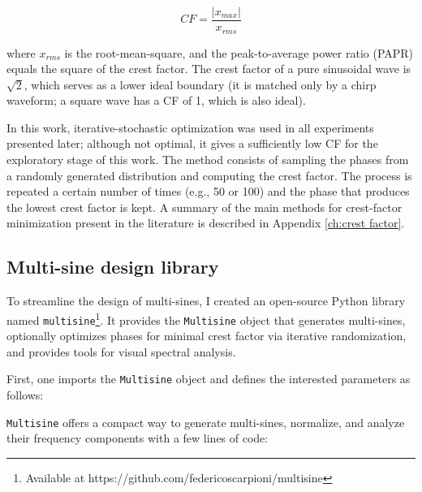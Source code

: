 $$
CF = \frac{|x_{max}|}{x_{rms}}
$$

where $x_{rms}$ is the root-mean-square, and the peak-to-average power ratio (PAPR) equals the square of the crest factor.
The crest factor of a pure sinusoidal wave is $\sqrt{2}$, which serves as a lower ideal boundary (it is matched only by a chirp waveform; a square wave has a CF of 1, which is also ideal). 
 
In this work, iterative-stochastic optimization was used in all experiments presented later; although not optimal, it gives a sufficiently low CF for the exploratory stage of this work.
The method consists of sampling the phases from a randomly generated distribution and computing the crest factor.
The process is repeated a certain number of times (e.g., 50 or 100) and the phase that produces the lowest crest factor is kept.
A summary of the main methods for crest-factor minimization present in the literature is described in Appendix \ref{ch:crest factor}.

\subsection{Multi-sine design library}

To streamline the design of multi-sines, I created an open-source Python library named \verb|multisine|\footnote{Available at https://github.com/federicoscarpioni/multisine}.
It provides the \verb|Multisine| object that generates multi-sines, optionally optimizes phases for minimal crest factor via iterative randomization, and provides tools for visual spectral analysis. 

First, one imports the \verb|Multisine| object and defines the interested parameters as follows:


\verb|Multisine| offers a compact way to generate multi-sines, normalize, and analyze their frequency components with a few lines of code:


